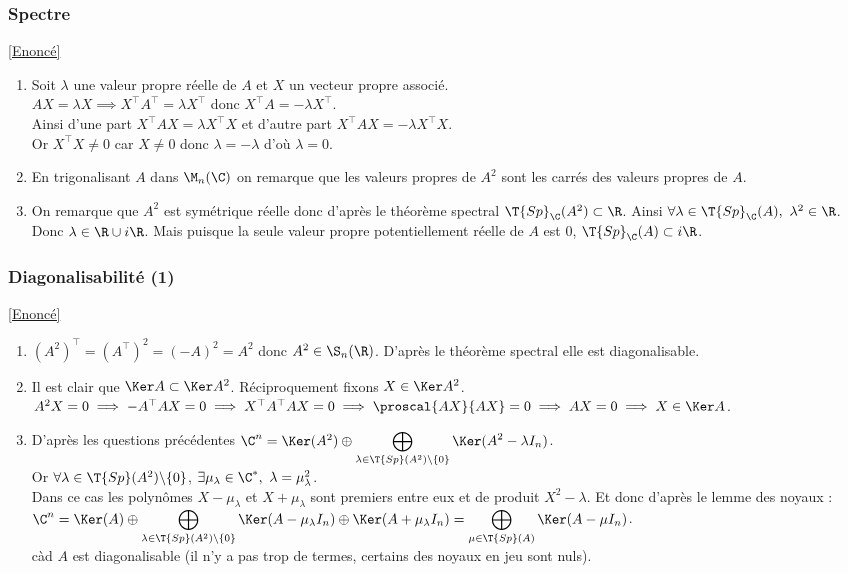 \documentclass[8pt]{book}
\begin{document}
	\subsubsection{Spectre}
	\label{Spectre corrigé}
	\textcolor{blue}{\hyperref[Spectre]{[Enoncé]}}\\
	\begin{enumerate}[leftmargin=*]
		\item Soit $\lambda$ une valeur propre réelle de $A$ et $X$ un vecteur propre associé.\\
		$AX=\lambda X\implies X^\top A^\top=\lambda X^\top$ donc $X^\top A=-\lambda X^\top$.\\
		Ainsi d'une part $X^\top AX=\lambda X^\top X$ et d'autre part $X^\top AX=-\lambda X^\top X$.\\
		Or $X^\top X\ne 0$ car $X\ne 0$ donc $\lambda=-\lambda$ d'où $\lambda=0$.
		\item En trigonalisant $A$ dans $\M_n(\C)$ on remarque que les valeurs propres de $A^2$ sont les carrés des valeurs propres de $A$.
		\item On remarque que $A^2$ est symétrique réelle donc d'après le théorème spectral $\T{Sp}_\C(A^2)\subset \R$. Ainsi $\forall \lambda\in \T{Sp}_\C(A),\ \lambda^2\in \R$. Donc $\lambda\in \R\cup i\R$. Mais puisque la seule valeur propre potentiellement réelle de $A$ est $0$, $\T{Sp}_\C(A)\subset i\R$.
	\end{enumerate}
	
	\subsubsection{Diagonalisabilité (1)}
	\label{Diagonalisabilité (1) corrigé}
	\textcolor{blue}{\hyperref[Diagonalisabilité (1)]{[Enoncé]}}\\
	\begin{enumerate}
		\item $(A^2)^\top=(A^\top)^2=(-A)^2=A^2$ donc $A^2\in \S_n(\R)$. D'après le théorème spectral elle est diagonalisable.
		\item Il est clair que $\Ker A\subset \Ker A^2$. Réciproquement fixons $X\in \Ker A^2$.\\
		$A^2X=0\implies -A^\top AX=0\implies X^\top A^\top AX=0\implies \proscal{AX}{AX}=0\implies AX=0\implies X\in \Ker A$.
		\item D'après les questions précédentes $\C^n=\Ker(A^2)\oplus\displaystyle\bigoplus_{\lambda\in \T{Sp}(A^2)\backslash\{0\}}\Ker(A^2-\lambda I_n)$.\\
		Or $\forall \lambda\in \T{Sp}(A^2)\backslash\{0\}$, $\exists \mu_\lambda\in \C^*,\ \lambda=\mu_\lambda^2$.\\
		Dans ce cas les polynômes $X-\mu_\lambda$ et $X+\mu_\lambda$ sont premiers entre eux et de produit $X^2-\lambda$. Et donc d'après le lemme des noyaux :\\
		$\C^n=\Ker(A)\oplus\displaystyle\bigoplus_{\lambda\in \T{Sp}(A^2)\backslash\{0\}}\Ker(A-\mu_\lambda I_n)\oplus\Ker(A+\mu_\lambda I_n)=\bigoplus_{\mu\in \T{Sp}(A)}\Ker(A-\mu I_n)$.\\
		càd $A$ est diagonalisable (il n'y a pas trop de termes, certains des noyaux en jeu sont nuls).
	\end{enumerate}
	
\end{document}
